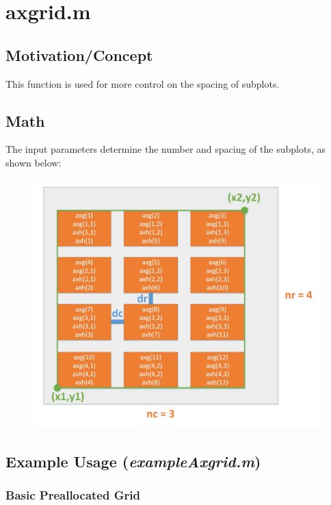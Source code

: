 \documentclass{article}
\begin{document}
	\section{axgrid.m}
	
	\subsection{Motivation/Concept}
	This function is used for more control on the spacing of subplots.  
	\clearpage
	\subsection{Math}
	The input parameters determine the number and spacing of the subplots, as shown below:
	\begin{figure}[H]
		\centering
		\includegraphics[height = \linewidth]{axgridDimensions}
	\end{figure}

	\clearpage
	\subsection*{Example Usage (\textit{exampleAxgrid.m})}
	\subsubsection*{Basic Preallocated Grid}
\end{document}
